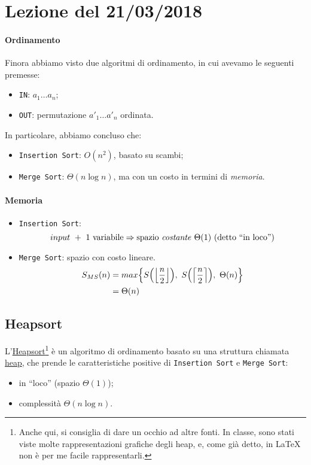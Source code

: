 \section{Lezione del 21/03/2018}
\paragraph{Ordinamento} Finora abbiamo visto due algoritmi di ordinamento, in cui avevamo le seguenti 
premesse:
\begin{itemize}
	\item[] \texttt{IN}: $a_1\dots a_n$;
	\item[] \texttt{OUT}: permutazione $a'_1\dots a'_n$ ordinata.
\end{itemize}
In particolare, abbiamo concluso che:
\begin{itemize}
	\item \texttt{Insertion Sort}: $O(n^2)$, basato su scambi;
	\item \texttt{Merge Sort}: $\Theta(n \log n)$, ma con un costo in termini di \emph{memoria}.
\end{itemize}

\paragraph{Memoria} 
\begin{itemize}
	\item \texttt{Insertion Sort}: 
	$$input \ + \ 1 \text{ variabile} \Rightarrow 
		\text{spazio \emph{costante} } \Theta (1) \text{ (detto ``in loco'')}$$
	\item \texttt{Merge Sort}: spazio con costo lineare.
	\begin{align*}
		S_{MS}(n) & = max\Big{\{} S\Big( \Big{\lfloor}{\frac{n}{2}}\Big{\rfloor} \Big), 
		\ S\Big( \Big{\lceil}{\frac{n}{2}}\Big{\rceil} \Big), \ \Theta (n) \Big{\}} \\
		& = \Theta (n)
	\end{align*}
\end{itemize}

\subsection{Heapsort} \label{heapsort} 
L'\href{https://en.wikipedia.org/wiki/Heapsort}{Heapsort}\footnote{Anche qui, si consiglia di dare %
un occhio ad altre fonti. In classe, sono stati viste molte rappresentazioni grafiche degli heap, %
e, come già detto, in \LaTeX $\ $non è per me facile rappresentarli.} è un algoritmo di ordinamento 
basato su 
una struttura chiamata \href{https://en.wikipedia.org/wiki/Heap_(data_structure)}{heap}, che prende le caratteristiche positive di 
\texttt{Insertion Sort} e \texttt{Merge Sort}:
\begin{itemize}[noitemsep]
	\item in ``loco'' (spazio $\Theta (1)$);
	\item complessità $\Theta(n \log n)$.
\end{itemize}

